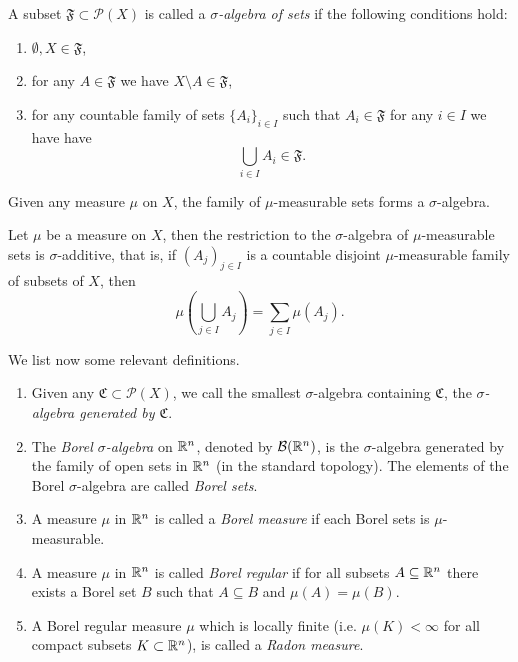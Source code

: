 \begin{definition}
A subset $\mathfrak{F} \subset \mathcal{P}(X)$ is called a \emph{$\sigma$-algebra of
sets} if the following conditions hold:
\begin{enumerate}[(1)]
\item $\emptyset,X \in \mathfrak{F}$,
\item for any $A \in \mathfrak{F}$ we have $X\setminus A \in \mathfrak{F}$,
\item for any countable family of sets $\{A_i\}_{i \in I}$ such that $A_{i} \in \mathfrak{F}$ for any $i \in I$ we have 
have $$\bigcup_{i\in I} A_i \in \mathfrak{F}.$$
\end{enumerate}
\end{definition}

\begin{theorem}
Given any measure $\mu$ on $X$, the family of $\mu$-measurable sets forms a $\sigma$-algebra.
\end{theorem}

\begin{theorem}
Let $\mu$ be a measure on $X$, then the restriction to the
$\sigma$-algebra of $\mu$-measurable sets is $\sigma$-additive, that is, if
$(A_j)_{j\in I}$ is a countable disjoint $\mu$-measurable family of
subsets of $X$, then 
\[
\mu\left(\bigcup_{j \in I} A_j\right) = \sum_{j\in I} \mu\left(A_j\right).
\]
\end{theorem}

We list now some relevant definitions.

\begin{definition} \label{def:Borel_Radon_measure} \hfill
\begin{enumerate}[(1)]
\item Given any $\mathfrak{C} \subset \mathcal{P}(X)$, we call the smallest
$\sigma$-algebra containing $\mathfrak{C}$, the \emph{$\sigma$-algebra generated by
$\mathfrak{C}$}.%
\item The \emph{Borel $\sigma$-algebra} on $\mathbb{R}^n$, denoted by $\mathcal{B}(\mathbb{R}^n)$, is the
$\sigma$-algebra generated by the family of open sets in $\mathbb{R}^n$ (in the standard
topology). The elements of the Borel $\sigma$-algebra are called \emph{Borel sets}.
\item A measure $\mu$ in $\mathbb{R}^n$ is called a \emph{Borel measure} if each
Borel sets is $\mu$-measurable.
\item A measure $\mu$ in $\mathbb{R}^n$ is called \emph{Borel regular} if for
all subsets $A \subseteq \mathbb{R}^n$ there exists a Borel set $B$ such that $A \subseteq
B$ and $\mu(A) = \mu(B)$.
\item A Borel regular measure $\mu$ which is locally finite (i.e. $\mu(K) <
\infty$ for all compact subsets $K \subset \mathbb{R}^n$), is called a \emph{Radon measure}.
\end{enumerate}
\end{definition}

